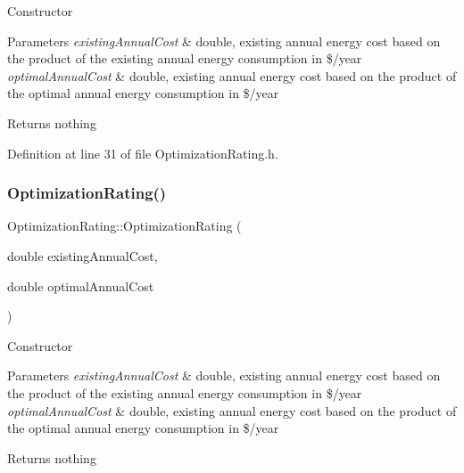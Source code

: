 Constructor 
\begin{DoxyParams}{Parameters}
{\em existing\+Annual\+Cost} & double, existing annual energy cost based on the product of the existing annual energy consumption in \$/year \\
\hline
{\em optimal\+Annual\+Cost} & double, existing annual energy cost based on the product of the optimal annual energy consumption in \$/year \\
\hline
\end{DoxyParams}
\begin{DoxyReturn}{Returns}
nothing 
\end{DoxyReturn}


Definition at line 31 of file Optimization\+Rating.\+h.

\mbox{\label{class_optimization_rating_a775f099775418ff79ae82091f7867c5c}} 
\subsubsection{\texorpdfstring{Optimization\+Rating()}{OptimizationRating()}\hspace{0.1cm}{\footnotesize\ttfamily [2/3]}}
{\footnotesize\ttfamily Optimization\+Rating\+::\+Optimization\+Rating (\begin{DoxyParamCaption}\item[{double}]{existing\+Annual\+Cost,  }\item[{double}]{optimal\+Annual\+Cost }\end{DoxyParamCaption})\hspace{0.3cm}{\ttfamily [inline]}}

Constructor 
\begin{DoxyParams}{Parameters}
{\em existing\+Annual\+Cost} & double, existing annual energy cost based on the product of the existing annual energy consumption in \$/year \\
\hline
{\em optimal\+Annual\+Cost} & double, existing annual energy cost based on the product of the optimal annual energy consumption in \$/year \\
\hline
\end{DoxyParams}
\begin{DoxyReturn}{Returns}
nothing 
\end{DoxyReturn}


